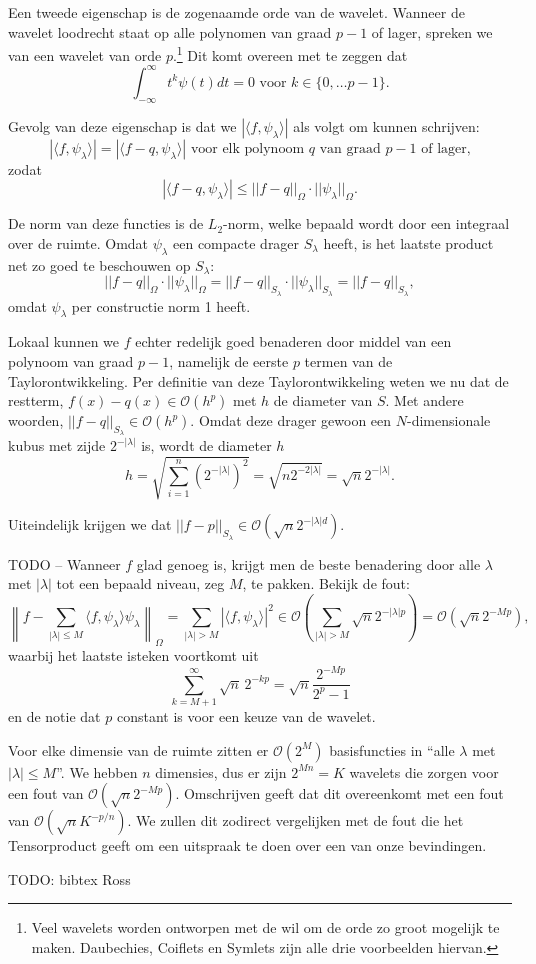 \documentclass[11pt]{amsart}
\theoremstyle{definition}
\begin{document}
Een tweede eigenschap is de zogenaamde orde van de wavelet. Wanneer de wavelet loodrecht staat op alle polynomen van graad $p-1$ of lager, spreken we van een wavelet van orde $p$.\footnote{Veel wavelets worden ontworpen met de wil om de orde zo groot mogelijk te maken. Daubechies, Coiflets en Symlets zijn alle drie voorbeelden hiervan.} Dit komt overeen met te zeggen dat
\[
	\int_{-\infty}^\infty t^k \psi(t) dt = 0 \text{ voor } k \in \{ 0, \ldots p-1 \}.
\]

Gevolg van deze eigenschap is dat we $|\langle f, \psi_\lambda\rangle |$ als volgt om kunnen schrijven:
\[
	|\langle f, \psi_\lambda \rangle | = |\langle f-q, \psi_\lambda \rangle | \text{ voor elk polynoom $q$ van graad $p-1$ of lager,} 
\]
zodat
\[
	|\langle f-q, \psi_\lambda \rangle | \leq ||f-q||_\Omega \cdot ||\psi_\lambda||_\Omega.
\]

De norm van deze functies is de $L_2$-norm, welke bepaald wordt door een integraal over de ruimte. Omdat $\psi_\lambda$ een compacte drager $S_\lambda$ heeft, is het laatste product net zo goed te beschouwen op $S_\lambda$:
\[
	||f-q||_\Omega \cdot ||\psi_\lambda||_\Omega = ||f-q||_{S_\lambda} \cdot ||\psi_\lambda||_{S_\lambda} = ||f-q||_{S_\lambda},
\]
omdat $\psi_\lambda$ per constructie norm 1 heeft.

Lokaal kunnen we $f$ echter redelijk goed benaderen door middel van een polynoom van graad $p-1$, namelijk de eerste $p$ termen van de Taylorontwikkeling. Per definitie van deze Taylorontwikkeling weten we nu dat de restterm, $f(x)-q(x) \in \mathcal{O}(h^p)$ met $h$ de diameter van $S$.\cite[\S 31.\{3,4\}]{ross} Met andere woorden, $||f-q||_{S_\lambda} \in \mathcal{O}(h^p)$. Omdat deze drager gewoon een $N$-dimensionale kubus met zijde $2^{-|\lambda|}$ is, wordt de diameter $h$ 
\[
	h = \sqrt{\sum_{i=1}^n (2^{-|\lambda|})^2} = \sqrt{n 2^{-2|\lambda|}} = \sqrt{n} 2^{-|\lambda|}.
\]

Uiteindelijk krijgen we dat $||f-p||_{S_\lambda} \in \mathcal{O}(\sqrt{n} 2^{-|\lambda|d})$.

TODO -- Wanneer $f$ glad genoeg is, krijgt men de beste benadering door alle $\lambda$ met $|\lambda|$ tot een bepaald niveau, zeg $M$, te pakken. Bekijk de fout:
\[
	\left\| f - \sum_{|\lambda| \leq M} \langle f, \psi_\lambda \rangle \psi_\lambda \right\|_\Omega = \sum_{|\lambda| > M} | \langle f, \psi_\lambda \rangle |^2 \in \mathcal{O}\left(\sum_{|\lambda| > M} \sqrt{n} 2^{-|\lambda|p} \right) = \mathcal{O}(\sqrt{n}2^{-Mp}),
\]
waarbij het laatste isteken voortkomt uit
\[
	\sum_{k=M+1}^\infty \sqrt{n} \, 2^{- kp} = \sqrt{n} \frac{2^{-Mp}}{2^p-1}
\]
en de notie dat $p$ constant is voor een keuze van de wavelet.

Voor elke dimensie van de ruimte zitten er $\mathcal{O}(2^M)$ basisfuncties in ``alle $\lambda$ met $|\lambda| \leq M$''. We hebben $n$ dimensies, dus er zijn $2^{Mn} = K $ wavelets die zorgen voor een fout van $\mathcal{O}(\sqrt{n} 2^{-Mp})$. Omschrijven geeft dat dit overeenkomt met een fout van $\mathcal{O}(\sqrt{n} K^{-p/n})$. We zullen dit zodirect vergelijken met de fout die het Tensorproduct geeft om een uitspraak te doen over een van onze bevindingen.

TODO: bibtex Ross
\end{document}
